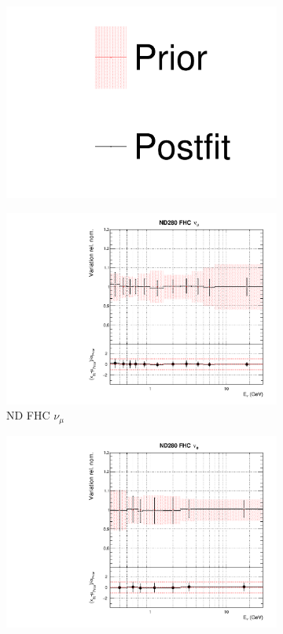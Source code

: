 \begin{figure}
\centering
\begin{subfigure}{0.95\textwidth}
  \centering
  \includegraphics[width=0.24\linewidth]{figs/asmv_leg}
  \caption{}
  \label{fig:}
\end{subfigure}
\begin{subfigure}{0.24\textwidth}
  \centering
  \includegraphics[width=0.95\linewidth]{figs/asmvflux0}
  \caption{ND FHC $\nu_{\mu}$}
  \label{fig:}
\end{subfigure}
\begin{subfigure}{0.24\textwidth}
  \centering
  \includegraphics[width=0.95\linewidth]{figs/asmvflux1}

\end{subfigure}
\end{figure}
